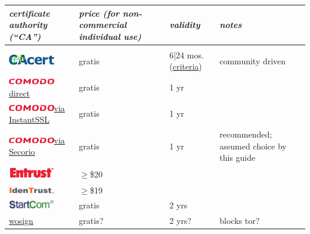 \documentclass[pdftex,12pt,titlepage=false]{scrartcl}
\newcommand{\secorio}{\href{https://www.secorio.com/}{\includegraphics[width=2cm]{images/logo_comodo.png}\tiny via Secorio}}
\begin{document}
\begin{tabular}{lp{2.3cm}l>{\tiny}l}
  \slshape certificate authority (``CA'')& \slshape price \newline\tiny(for non-commercial individual use) & \slshape validity & \slshape\normalsize notes\\
  \hline\\
  \href{https://www.cacert.org/}{\includegraphics[width=2cm]{images/logo_cacert4.png}} & gratis & 6|24 mos.\tiny (\href{http://wiki.cacert.org/FAQ/Privileges}{criteria}) & community driven\\
  \href{https://secure.comodo.com/products/frontpage?area=SecureEmailCertificate}{\includegraphics[width=2cm]{images/logo_comodo.png}\tiny direct} & gratis & 1 yr &\\
  \href{https://www.instantssl.com/ssl-certificate-products/free-email-certificate.html}{\includegraphics[width=2cm]{images/logo_comodo.png}\tiny via InstantSSL} & gratis & 1 yr &\\
  \secorio & gratis & 1 yr & recommended; assumed choice by this guide\\
  \href{https://www.entrust.com/secure-email-certificates/}{\includegraphics[width=2cm]{images/logo_entrust.png}} & $\geq$\$20 & \\
  \href{https://www.identrust.com/certificates/trustid.html}{\includegraphics[width=2cm]{images/logo_trustid.png}} & $\geq$\$19 & \\
  \href{https://www.startcomca.com/}{\includegraphics[width=2cm]{images/logo_startcom.png}} & gratis & 2 yrs & \\
  \href{https://buy.wosign.com/free/}{wosign} & gratis? & 2 yrs? & blocks tor?\\
\end{tabular}\\
\end{document}
